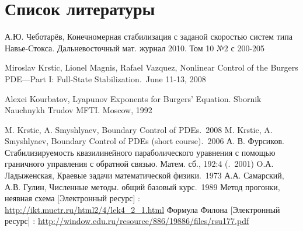 \section{Список литературы}
\vspace{2em}

\begingroup
\renewcommand{\section}[2]{}%
\begin{thebibliography}{}
\bibitem{}
	А.Ю. Чеботарёв, Конечномерная стабилизация с заданой скоростью систем типа Навье-Стокса. Дальневосточный мат. журнал 2010. Том 10 $№2$ с 200-205

\bibitem{}
  Miroslav Krstic, Lionel Magnis, Rafael Vazquez, Nonlinear Control of the Burgers PDE—Part I: Full-State Stabilization.\ June 11-13, 2008

\bibitem{}
  Alexei Kourbatov, Lyapunov Exponents for Burgers’ Equation. Sbornik Nauchnykh Trudov MFTI. Moscow, 1992

    M. Krstic, A. Smyshlyaev, Boundary Control of PDEs.\ 2008
\bibitem{}
	M. Krstic, A. Smyshlyaev, Boundary Control of PDEs (short course).\ 2006
\bibitem{}
    А. В. Фурсиков. Стабилизируемость квазилинейного параболического уравнения с помощью граничного управления с обратной связью. Матем. сб., 192:4 (.\ 2001)
\bibitem{}
	O.А. Ладыженская, Краевые задачи математической физики.\ 1973
\bibitem{}
	А.А. Самарский, А.В. Гулин, Численные методы. общий базовый курс.\ 1989
\bibitem{}
	Метод прогонки, неявная схема [Электронный ресурс] : \url{http://ikt.muctr.ru/html2/4/lek4_2_1.html}
\bibitem{}
	Формула Филона [Электронный ресурс] : \url{http://window.edu.ru/resource/886/19886/files/rsu177.pdf}

\end{thebibliography}
\endgroup